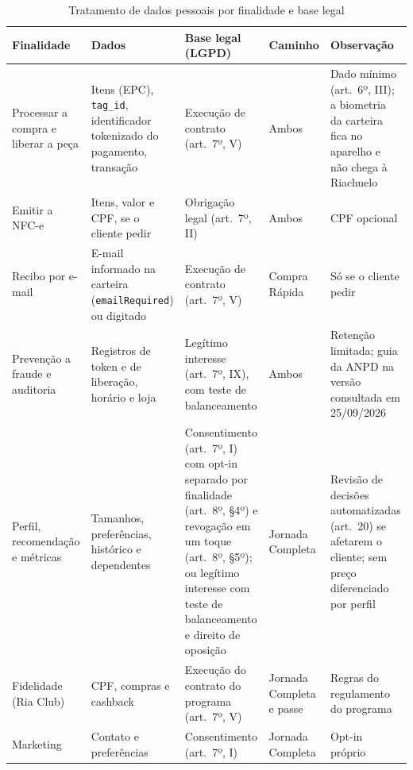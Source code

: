 \begin{table}[htbp]
    \centering
    \caption{Tratamento de dados pessoais por finalidade e base legal}
    \label{tab:r2-lgpd}
    \scriptsize
    \setlength{\tabcolsep}{4pt}
    \renewcommand{\arraystretch}{1.25}
    \begin{tabularx}{\textwidth}{@{}
        >{\RaggedRight\arraybackslash}p{2.3cm}
        >{\RaggedRight\arraybackslash}X
        >{\RaggedRight\arraybackslash}X
        >{\RaggedRight\arraybackslash}p{1.8cm}
        >{\RaggedRight\arraybackslash}X@{}}
        \toprule
        \textbf{Finalidade} & \textbf{Dados} & \textbf{Base legal (LGPD)} & \textbf{Caminho} & \textbf{Observação} \\
        \midrule
        Processar a compra e liberar a peça & Itens (EPC), \texttt{tag\_id}, identificador tokenizado do pagamento, transação & Execução de contrato (art.~7º, V) & Ambos & Dado mínimo (art.~6º, III); a biometria da carteira fica no aparelho e não chega à Riachuelo \\
        Emitir a NFC-e & Itens, valor e CPF, se o cliente pedir & Obrigação legal (art.~7º, II) & Ambos & CPF opcional \\
        Recibo por e-mail & E-mail informado na carteira (\texttt{emailRequired}) ou digitado & Execução de contrato (art.~7º, V) & Compra Rápida & Só se o cliente pedir \\
        Prevenção a fraude e auditoria & Registros de token e de liberação, horário e loja & Legítimo interesse (art.~7º, IX), com teste de balanceamento & Ambos & Retenção limitada; guia da ANPD na versão consultada em 25/09/2026 \\
        Perfil, recomendação e métricas & Tamanhos, preferências, histórico e dependentes & Consentimento (art.~7º, I) com opt-in separado por finalidade (art.~8º, §4º) e revogação em um toque (art.~8º, §5º); ou legítimo interesse com teste de balanceamento e direito de oposição & Jornada Completa & Revisão de decisões automatizadas (art.~20) se afetarem o cliente; sem preço diferenciado por perfil \\
        Fidelidade (Ria Club) & CPF, compras e cashback & Execução do contrato do programa (art.~7º, V) & Jornada Completa e passe & Regras do regulamento do programa \\
        Marketing & Contato e preferências & Consentimento (art.~7º, I) & Jornada Completa & Opt-in próprio \\
        \bottomrule
    \end{tabularx}
\end{table}

